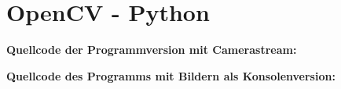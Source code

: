 
\section{OpenCV - Python}
\label{sec:OpenCV}
\textbf{Quellcode der Programmversion mit Camerastream:}
\lstset{language=Python}

\textbf{Quellcode des Programms mit Bildern als Konsolenversion:}
\lstset{language=Python}

